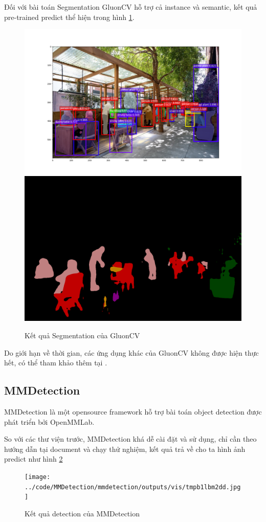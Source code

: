 Đối với bài toán Segmentation GluonCV hỗ trợ cả instance và semantic, kết quả pre-trained predict thể hiện trong hình \ref{fig:gluon_segmentation}. 

\begin{figure}
    \centering
    \includegraphics[scale=0.3]{../code/processed/gluon_segmentation.png}
    \includegraphics[scale=0.2]{../code/processed/FCN_sematic.png}
    \caption{Kết quả Segmentation của GluonCV}
    \label{fig:gluon_segmentation}
\end{figure}

Do giới hạn về thời gian, các ứng dụng khác của GluonCV không được hiện thực hết, có thể tham khảo thêm tại \cite{gluonCVdocument}.

\subsection{MMDetection}

MMDetection là một opensource framework hỗ trợ bài toán object detection được phát triển bởi OpenMMLab\cite{OpenMMLab}.

So với các thư viện trước, MMDetection khá dễ cài đặt và sử dụng, chỉ cần theo hướng dẫn tại document và chạy thử nghiệm, kết quả trả về cho ta hình ảnh predict như hình \ref{fig:MMDetection}

\begin{figure}
    \centering
    \texttt{[image: ../code/MMDetection/mmdetection/outputs/vis/tmpb1lbm2dd.jpg]}
    \caption{Kết quả detection của MMDetection}
    \label{fig:MMDetection}
\end{figure}
